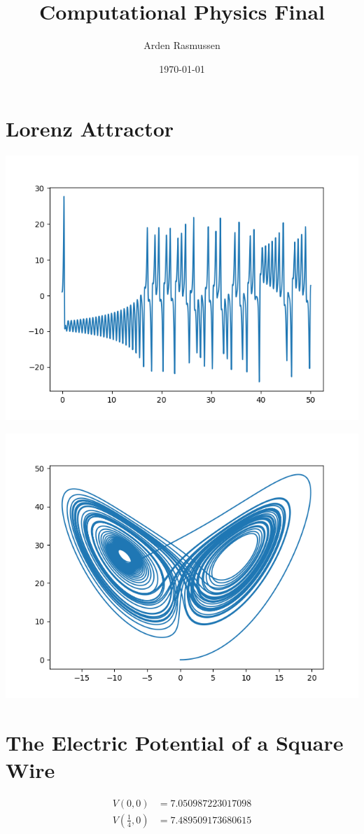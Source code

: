 \documentclass[10pt]{amsart}
\author{Arden Rasmussen}
\title{Computational Physics Final}
\date{\today}
\begin{document}
\maketitle
\section{Lorenz Attractor}%
\label{sec:lorenz_attractor}

\centering
\includegraphics[width=0.8\linewidth]{../P1_a.png}

\centering
\includegraphics[width=0.8\linewidth]{../P1_b.png}

\section{The Electric Potential of a Square Wire}%
\label{sec:the_electric_potential_of_a_square_wire}

\begin{align*}
    V(0,0) &= 7.050987223017098\\
    V\left(\frac{1}{4},0\right) &= 7.489509173680615
\end{align*}
\end{document}
